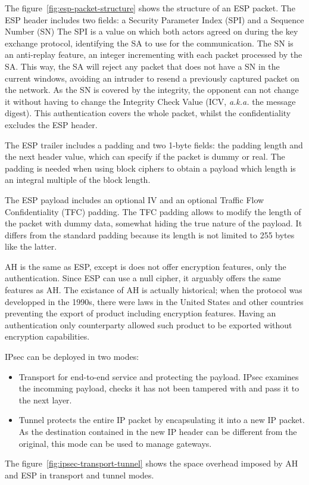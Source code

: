 The figure~\ref{fig:esp-packet-structure} shows the structure of an ESP packet.
The ESP header includes two fields: a Security Parameter Index (SPI) and a Sequence Number (SN)
The SPI is a value on which both actors agreed on during the key exchange protocol, identifying the SA to use for the communication.
The SN is an anti-replay feature, an integer incrementing with each packet processed by the SA. This way, the SA will reject any packet that does not have a SN in the current windows, avoiding an intruder to resend a previously captured packet on the network.
As the SN is covered by the integrity, the opponent can not change it without having to change the Integrity Check Value (ICV, \textit{a.k.a.} the message digest).
This authentication covers the whole packet, whilst the confidentiality excludes the ESP header.

\noindent The ESP trailer includes a padding and two 1-byte fields: the padding length and the next header value, which can specify if the packet is dummy or real.
The padding is needed when using block ciphers to obtain a payload which length is an integral multiple of the block length.

\noindent The ESP payload includes an optional IV and an optional Traffic Flow Confidentiality (TFC) padding.
The TFC padding allows to modify the length of the packet with dummy data, somewhat hiding the true nature of the payload.
It differs from the standard padding because its length is not limited to 255 bytes like the latter.

\noindent AH is the same as ESP, except is does not offer encryption features, only the authentication.
Since ESP can use a null cipher, it arguably offers the same features as AH.
The existance of AH is actually historical; when the protocol was developped in the 1990s, there were laws in the United States and other countries preventing the export of product including encryption features.
Having an authentication only counterparty allowed such product to be exported without encryption capabilities.\newline{}

IPsec can be deployed in two modes: 
\begin{itemize}
	\item Transport for end-to-end service and protecting the payload. IPsec examines the incomming payload, checks it has not been tampered with and pass it to the next layer.
	\item Tunnel protects the entire IP packet by encapsulating it into a new IP packet. As the destination contained in the new IP header can be different from the original, this mode can be used to manage gateways.
\end{itemize}
The figure~\ref{fig:ipsec-transport-tunnel} shows the space overhead imposed by AH and ESP in transport and tunnel modes.

